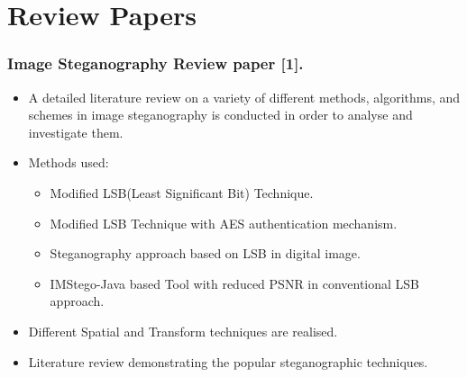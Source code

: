 \documentclass{beamer} %
\theoremstyle{definition} %
\begin{document}
\section{Review Papers}
\begin{frame}
\frametitle{Image Steganography Review paper [1].}
\begin{itemize}
	\item{ A detailed literature review on a
		variety of different methods, algorithms, and schemes in image steganography is conducted in order to analyse and
		investigate them.}
   \item{Methods used:}
   \begin{itemize}
   	\item{Modified LSB(Least Significant Bit) Technique. }
   	\item{Modified LSB Technique with AES authentication mechanism.  }
   	\item{Steganography approach based on LSB in digital image.  }
   	\item{IMStego-Java based Tool with reduced PSNR in conventional LSB approach. }
   \end{itemize}
   \item{ Different Spatial and Transform techniques are realised.  }
   \item{Literature review demonstrating the popular steganographic techniques.}
\end{itemize}
\end{frame}
\end{document}

